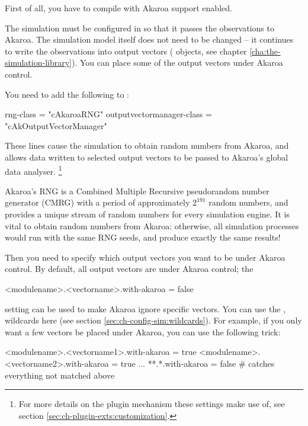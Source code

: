 First of all, you have to compile {\opp} with Akaroa support enabled.

The {\opp} simulation must be configured in 
so that it passes the observations to Akaroa. The simulation model itself does
not need to be changed -- it continues to write
the observations into output vectors ( objects,
see chapter \ref{cha:the-simulation-library}). You can place some of
the output vectors under Akaroa control.

You need to add the following to :

\begin{inifile}
[General]
rng-class = "cAkaroaRNG"
outputvectormanager-class = "cAkOutputVectorManager"
\end{inifile}

These lines cause the simulation to obtain random numbers from Akaroa,
and allows data written to selected output vectors to be passed to Akaroa's
global data analyser.
    \footnote{For more details on the plugin mechanism these settings make use of,
    see section \ref{sec:ch-plugin-exts:customization}.}

Akaroa's RNG is a Combined Multiple Recursive pseudorandom
number generator (CMRG) with a period of approximately $2^{191}$
random numbers, and provides a unique stream of random numbers
for every simulation engine. It is vital to obtain random numbers
from Akaroa: otherwise, all simulation processes would run with the same
RNG seeds, and produce exactly the same results!

Then you need to specify which output vectors you want to
be under Akaroa control. By default, all output vectors are under Akaroa
control; the

\begin{inifile}
<modulename>.<vectorname>.with-akaroa = false
\end{inifile}

setting can be used to make Akaroa ignore specific vectors.
You can use the \ttt{*}, \ttt{**} wildcards here (see
section \ref{sec:ch-config-sim:wildcards}). For example,
if you only want a few vectors be placed under Akaroa,
you can use the following trick:

\begin{inifile}
<modulename>.<vectorname1>.with-akaroa = true
<modulename>.<vectorname2>.with-akaroa = true
...
**.*.with-akaroa = false  # catches everything not matched above
\end{inifile}



